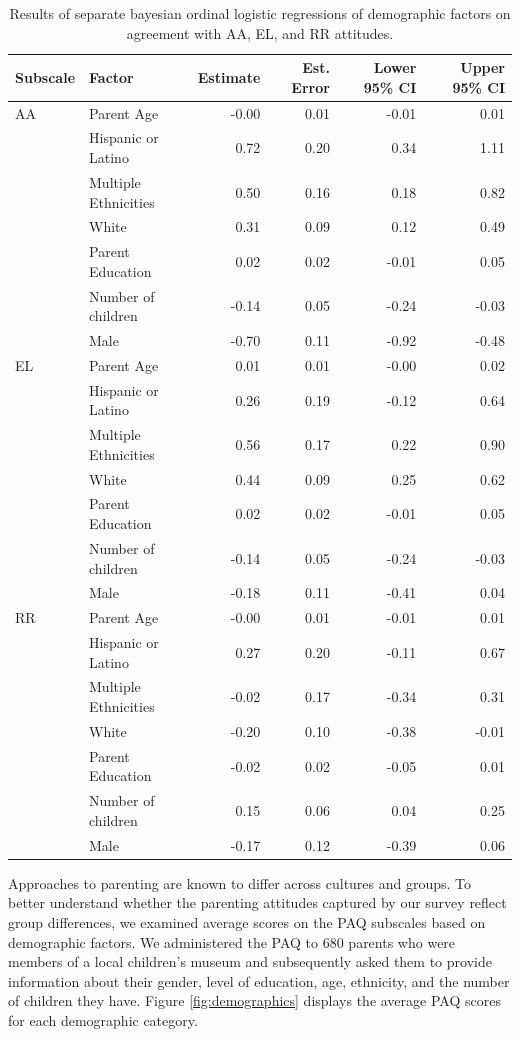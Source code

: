 \documentclass[man]{apa6}
\theoremstyle{definition}
\theoremstyle{definition}
\theoremstyle{definition}
\theoremstyle{remark}
\begin{document}
\begin{table}[h]
\centering
\caption{Results of separate bayesian ordinal logistic regressions of demographic factors on agreement with AA, EL, and RR attitudes.} 
\label{tab:demo}
\begin{tabular}{llrrrr}
  \hline
Subscale & Factor & Estimate & Est. Error & Lower 95\% CI & Upper 95\% CI \\ 
  \hline
AA & Parent Age & -0.00 & 0.01 & -0.01 & 0.01 \\ 
   & Hispanic or Latino & 0.72 & 0.20 & 0.34 & 1.11 \\ 
   & Multiple Ethnicities & 0.50 & 0.16 & 0.18 & 0.82 \\ 
   & White & 0.31 & 0.09 & 0.12 & 0.49 \\ 
   & Parent Education & 0.02 & 0.02 & -0.01 & 0.05 \\ 
   & Number of children & -0.14 & 0.05 & -0.24 & -0.03 \\ 
   & Male & -0.70 & 0.11 & -0.92 & -0.48 \\ 
   \hline
EL & Parent Age & 0.01 & 0.01 & -0.00 & 0.02 \\ 
   & Hispanic or Latino & 0.26 & 0.19 & -0.12 & 0.64 \\ 
   & Multiple Ethnicities & 0.56 & 0.17 & 0.22 & 0.90 \\ 
   & White & 0.44 & 0.09 & 0.25 & 0.62 \\ 
   & Parent Education & 0.02 & 0.02 & -0.01 & 0.05 \\ 
   & Number of children & -0.14 & 0.05 & -0.24 & -0.03 \\ 
   & Male & -0.18 & 0.11 & -0.41 & 0.04 \\ 
   \hline
RR & Parent Age & -0.00 & 0.01 & -0.01 & 0.01 \\ 
   & Hispanic or Latino & 0.27 & 0.20 & -0.11 & 0.67 \\ 
   & Multiple Ethnicities & -0.02 & 0.17 & -0.34 & 0.31 \\ 
   & White & -0.20 & 0.10 & -0.38 & -0.01 \\ 
   & Parent Education & -0.02 & 0.02 & -0.05 & 0.01 \\ 
   & Number of children & 0.15 & 0.06 & 0.04 & 0.25 \\ 
   & Male & -0.17 & 0.12 & -0.39 & 0.06 \\ 
   \hline
\end{tabular}
\end{table}

Approaches to parenting are known to differ across cultures and groups.
To better understand whether the parenting attitudes captured by our
survey reflect group differences, we examined average scores on the PAQ
subscales based on demographic factors. We administered the PAQ to 680
parents who were members of a local children's museum and subsequently
asked them to provide information about their gender, level of
education, age, ethnicity, and the number of children they have. Figure
\ref{fig:demographics} displays the average PAQ scores for each
demographic category.
\end{document}

